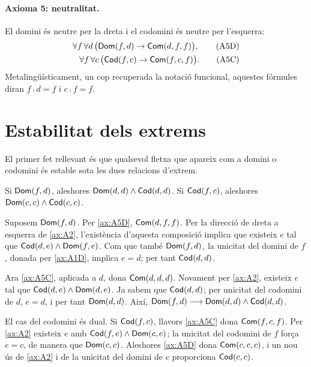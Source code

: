 \paragraph{Axioma 5: neutralitat.}
El domini és neutre per la dreta i el codomini és neutre per l'esquerra:
\begin{align}
\forall f\,\forall d\,
\bigl(\mathsf{Dom}(f,d)\rightarrow\mathsf{Com}(d,f,f)\bigr),
\tag{A5D}\label{ax:A5D}\\
\forall f\,\forall c\,
\bigl(\mathsf{Cod}(f,c)\rightarrow\mathsf{Com}(f,c,f)\bigr).
\tag{A5C}\label{ax:A5C}
\end{align}
Metalingüísticament, un cop recuperada la notació funcional, aquestes fórmules diran $f\comp d=f$ i $c\comp f=f$.

\section{Estabilitat dels extrems}
\label{sec:ar-estabilitat}

El primer fet rellevant és que qualsevol fletxa que apareix com a domini o codomini és estable sota les dues relacions d'extrem.

\begin{proposicio}
\label{prop:ar-estabilitat}
Si $\mathsf{Dom}(f,d)$, aleshores $\mathsf{Dom}(d,d)\land\mathsf{Cod}(d,d)$. Si $\mathsf{Cod}(f,c)$, aleshores $\mathsf{Dom}(c,c)\land\mathsf{Cod}(c,c)$.
\end{proposicio}

\begin{prova}
Suposem $\mathsf{Dom}(f,d)$. Per \eqref{ax:A5D}, $\mathsf{Com}(d,f,f)$. Per la direcció de dreta a esquerra de \eqref{ax:A2}, l'existència d'aquesta composició implica que existeix $e$ tal que $\mathsf{Cod}(d,e)\land\mathsf{Dom}(f,e)$. Com que també $\mathsf{Dom}(f,d)$, la unicitat del domini de $f$, donada per \eqref{ax:A1D}, implica $e=d$; per tant $\mathsf{Cod}(d,d)$.

Ara \eqref{ax:A5C}, aplicada a $d$, dona $\mathsf{Com}(d,d,d)$. Novament per \eqref{ax:A2}, existeix $e$ tal que $\mathsf{Cod}(d,e)\land\mathsf{Dom}(d,e)$. Ja sabem que $\mathsf{Cod}(d,d)$; per unicitat del codomini de $d$, $e=d$, i per tant $\mathsf{Dom}(d,d)$. Així, $\mathsf{Dom}(f,d)\longrightarrow \mathsf{Dom}(d,d)\land\mathsf{Cod}(d,d)$.

El cas del codomini és dual. Si $\mathsf{Cod}(f,c)$, llavors \eqref{ax:A5C} dona $\mathsf{Com}(f,c,f)$. Per \eqref{ax:A2} existeix $e$ amb $\mathsf{Cod}(f,e)\land\mathsf{Dom}(c,e)$; la unicitat del codomini de $f$ força $e=c$, de manera que $\mathsf{Dom}(c,c)$. Aleshores \eqref{ax:A5D} dona $\mathsf{Com}(c,c,c)$, i un nou ús de \eqref{ax:A2} i de la unicitat del domini de $c$ proporciona $\mathsf{Cod}(c,c)$.
\end{prova}

